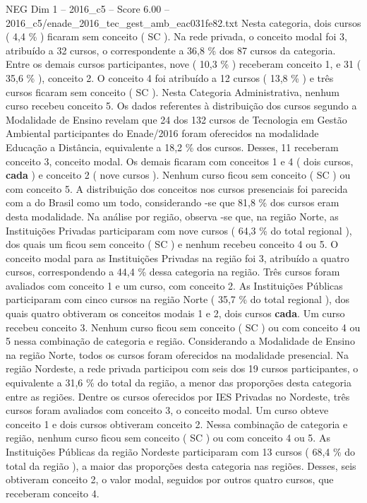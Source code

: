 \begin{textsample}{NEG Dim 1 – 2016\_c5 – Score 6.00 – 2016\_c5/enade\_2016\_tec\_gest\_amb\_eac031fe82.txt}
Nesta categoria, dois cursos ( 4,4 \% ) ficaram sem conceito ( SC ).
Na rede privada, o conceito modal foi 3, atribuído a 32 cursos, o correspondente a 36,8 \% dos 87 cursos da categoria.
Entre os demais cursos participantes, nove ( 10,3 \% ) receberam conceito 1, e 31 ( 35,6 \% ), conceito 2.
O conceito 4 foi atribuído a 12 cursos ( 13,8 \% ) e três cursos ficaram sem conceito ( SC ).
Nesta Categoria Administrativa, nenhum curso recebeu conceito 5.
Os dados referentes à distribuição dos cursos segundo a Modalidade de Ensino revelam que 24 dos 132 cursos de Tecnologia em Gestão Ambiental participantes do Enade/2016 foram oferecidos na modalidade Educação a Distância, equivalente a 18,2 \% dos cursos.
Desses, 11 receberam conceito 3, conceito modal.
Os demais ficaram com conceitos 1 e 4 ( dois cursos, \textbf{cada} ) e conceito 2 ( nove cursos ).
Nenhum curso ficou sem conceito ( SC ) ou com conceito 5.
A distribuição dos conceitos nos cursos presenciais foi parecida com a do Brasil como um todo, considerando -se que 81,8 \% dos cursos eram desta modalidade.
Na análise por região, observa -se que, na região Norte, as Instituições Privadas participaram com nove cursos ( 64,3 \% do total regional ), dos quais um ficou sem conceito ( SC ) e nenhum recebeu conceito 4 ou 5.
O conceito modal para as Instituições Privadas na região foi 3, atribuído a quatro cursos, correspondendo a 44,4 \% dessa categoria na região.
Três cursos foram avaliados com conceito 1 e um curso, com conceito 2.
As Instituições Públicas participaram com cinco cursos na região Norte ( 35,7 \% do total regional ), dos quais quatro obtiveram os conceitos modais 1 e 2, dois cursos \textbf{cada}.
Um curso recebeu conceito 3.
Nenhum curso ficou sem conceito ( SC ) ou com conceito 4 ou 5 nessa combinação de categoria e região.
Considerando a Modalidade de Ensino na região Norte, todos os cursos foram oferecidos na modalidade presencial.
Na região Nordeste, a rede privada participou com seis dos 19 cursos participantes, o equivalente a 31,6 \% do total da região, a menor das proporções desta categoria entre as regiões.
Dentre os cursos oferecidos por IES Privadas no Nordeste, três cursos foram avaliados com conceito 3, o conceito modal.
Um curso obteve conceito 1 e dois cursos obtiveram conceito 2.
Nessa combinação de categoria e região, nenhum curso ficou sem conceito ( SC ) ou com conceito 4 ou 5.
As Instituições Públicas da região Nordeste participaram com 13 cursos ( 68,4 \% do total da região ), a maior das proporções desta categoria nas regiões.
Desses, seis obtiveram conceito 2, o valor modal, seguidos por outros quatro cursos, que receberam conceito 4.

\end{textsample}
